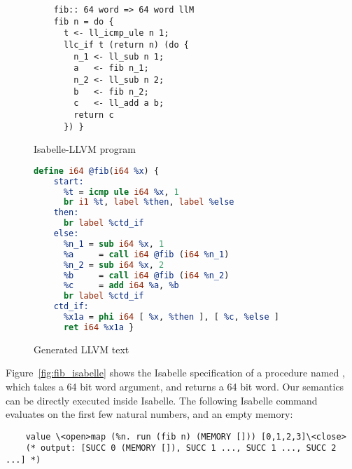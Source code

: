 \documentclass[a4paper,USenglish,cleveref, autoref]{lipics-v2019}
\begin{document}
\begin{figure}
\centering
\begin{minipage}[t]{.35\textwidth}
  \begin{lstlisting}
    fib:: 64 word => 64 word llM
    fib n = do {
      t <- ll_icmp_ule n 1;
      llc_if t (return n) (do {
        n_1 <- ll_sub n 1;
        a   <- fib n_1;
        n_2 <- ll_sub n 2;
        b   <- fib n_2;
        c   <- ll_add a b;
        return c
      }) }    
  \end{lstlisting}
  \caption{Isabelle-LLVM program}\label{fig:fib_isabelle}
\end{minipage}
\hfill
\begin{minipage}[t]{.57\textwidth}
  \begin{lstlisting}[language=LLVM, literate={}]
  define i64 @fib(i64 %x) {
    start:
      %t = icmp ule i64 %x, 1
      br i1 %t, label %then, label %else
    then:
      br label %ctd_if
    else:
      %n_1 = sub i64 %x, 1
      %a     = call i64 @fib (i64 %n_1)
      %n_2 = sub i64 %x, 2
      %b     = call i64 @fib (i64 %n_2)
      %c     = add i64 %a, %b
      br label %ctd_if
    ctd_if:
      %x1a = phi i64 [ %x, %then ], [ %c, %else ]
      ret i64 %x1a }  
  \end{lstlisting}
  \caption{Generated LLVM text}\label{fig:fib_llvm}
\end{minipage}
\end{figure}

\begin{example}\label{ex:fib_isabelle}
  Figure~\ref{fig:fib_isabelle} shows the Isabelle specification of a procedure named , 
  which takes a 64 bit word argument, and returns a 64 bit word. 
  Our semantics can be directly executed inside Isabelle. The following Isabelle command evaluates  on the first few natural numbers, and an empty memory:
  \begin{lstlisting}
    value \<open>map (%n. run (fib n) (MEMORY [])) [0,1,2,3]\<close>
    (* output: [SUCC 0 (MEMORY []), SUCC 1 ..., SUCC 1 ..., SUCC 2 ...] *)
  \end{lstlisting}
\end{example}
\end{document}
